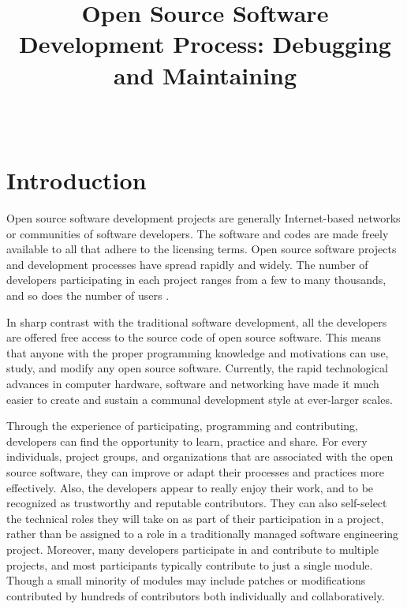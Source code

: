 \documentclass[draftclsnofoot,journal,onecolumn,12pt]{IEEEtran}
\begin{document}
\title{Open Source Software Development Process: Debugging and Maintaining}

\author{ \\
}

\maketitle
%

\section{Introduction}

Open source software development projects are generally Internet-based networks or communities of software developers. The software and codes are made freely available to all that adhere to the licensing terms. Open source software projects and development processes have spread rapidly and widely. The number of developers participating in each project ranges from a few to many thousands, and so does the number of users \cite{vonKrogh20031149}.

In sharp contrast with the traditional software development, all the developers are offered free access to the source code of open source software. This means that anyone with the proper programming knowledge and motivations can use, study, and modify any open source software. Currently, the rapid technological advances in computer hardware, software and networking have made it much easier to create and sustain a communal development style at ever-larger scales.

Through the experience of participating, programming and contributing, developers can find the opportunity to learn, practice and share. For every individuals, project groups, and organizations that are associated with the open source software, they can improve or adapt their processes and practices more effectively. Also, the developers appear to really enjoy their work, and to be recognized as trustworthy and reputable contributors. They can also self-select the technical roles they will take on as part of their participation in a project, rather than be assigned to a role in a traditionally managed software engineering project. Moreover, many developers participate in and contribute to multiple projects, and most participants typically contribute to just a single module. Though a small minority of modules may include patches or modifications contributed by hundreds of contributors both individually and collaboratively.
\end{document}
